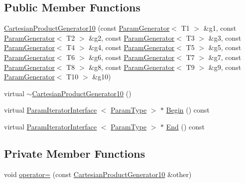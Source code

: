 \subsection*{\-Public \-Member \-Functions}
\begin{DoxyCompactItemize}
\item 
\hyperlink{classtesting_1_1internal_1_1CartesianProductGenerator10_abb5268763310c17178d4d761c5821625}{\-Cartesian\-Product\-Generator10} (const \hyperlink{classtesting_1_1internal_1_1ParamGenerator}{\-Param\-Generator}$<$ \-T1 $>$ \&g1, const \hyperlink{classtesting_1_1internal_1_1ParamGenerator}{\-Param\-Generator}$<$ \-T2 $>$ \&g2, const \hyperlink{classtesting_1_1internal_1_1ParamGenerator}{\-Param\-Generator}$<$ \-T3 $>$ \&g3, const \hyperlink{classtesting_1_1internal_1_1ParamGenerator}{\-Param\-Generator}$<$ \-T4 $>$ \&g4, const \hyperlink{classtesting_1_1internal_1_1ParamGenerator}{\-Param\-Generator}$<$ \-T5 $>$ \&g5, const \hyperlink{classtesting_1_1internal_1_1ParamGenerator}{\-Param\-Generator}$<$ \-T6 $>$ \&g6, const \hyperlink{classtesting_1_1internal_1_1ParamGenerator}{\-Param\-Generator}$<$ \-T7 $>$ \&g7, const \hyperlink{classtesting_1_1internal_1_1ParamGenerator}{\-Param\-Generator}$<$ \-T8 $>$ \&g8, const \hyperlink{classtesting_1_1internal_1_1ParamGenerator}{\-Param\-Generator}$<$ \-T9 $>$ \&g9, const \hyperlink{classtesting_1_1internal_1_1ParamGenerator}{\-Param\-Generator}$<$ \-T10 $>$ \&g10)
\item 
virtual \hyperlink{classtesting_1_1internal_1_1CartesianProductGenerator10_afeaf0079a156b329e42eb4cb1d9f6c41}{$\sim$\-Cartesian\-Product\-Generator10} ()
\item 
virtual \hyperlink{classtesting_1_1internal_1_1ParamIteratorInterface}{\-Param\-Iterator\-Interface}\*
$<$ \hyperlink{classtesting_1_1internal_1_1CartesianProductGenerator10_adffde37eb66ea6d9917ab9fd24b46926}{\-Param\-Type} $>$ $\ast$ \hyperlink{classtesting_1_1internal_1_1CartesianProductGenerator10_ab6a1e6ee0c9095fec4ca7dd2fe9736cd}{\-Begin} () const 
\item 
virtual \hyperlink{classtesting_1_1internal_1_1ParamIteratorInterface}{\-Param\-Iterator\-Interface}\*
$<$ \hyperlink{classtesting_1_1internal_1_1CartesianProductGenerator10_adffde37eb66ea6d9917ab9fd24b46926}{\-Param\-Type} $>$ $\ast$ \hyperlink{classtesting_1_1internal_1_1CartesianProductGenerator10_a2175654afa23856e885489861c353c72}{\-End} () const 
\end{DoxyCompactItemize}
\subsection*{\-Private \-Member \-Functions}
\begin{DoxyCompactItemize}
\item 
void \hyperlink{classtesting_1_1internal_1_1CartesianProductGenerator10_a67c008c5d124edfac268cfc000b278c4}{operator=} (const \hyperlink{classtesting_1_1internal_1_1CartesianProductGenerator10}{\-Cartesian\-Product\-Generator10} \&other)
\end{DoxyCompactItemize}
